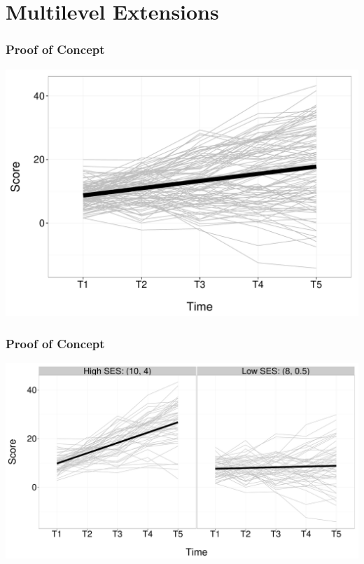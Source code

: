 \documentclass{beamer}\usepackage[]{graphicx}\usepackage[]{color}
\makeatletter
\def\maxwidth{ %
  \ifdim\Gin@nat@width>\linewidth
    \linewidth
  \else
    \Gin@nat@width
  \fi
}
\newenvironment{knitrout}{}{} %
\makeatother
\begin{document}

\section{Multilevel Extensions}
\begin{frame}
\frametitle{Proof of Concept}

\begin{knitrout}
\color{fgcolor}
\includegraphics[width=\maxwidth]{figure/longData-1} 

\end{knitrout}

\end{frame}


\begin{frame}
\frametitle{Proof of Concept}

\begin{knitrout}
\color{fgcolor}
\includegraphics[width=\maxwidth]{figure/longDataSub-1} 

\end{knitrout}

\end{frame}
\end{document}
